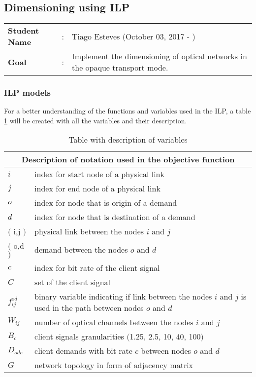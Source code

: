 \newpage
\subsection{Dimensioning using ILP}
\begin{tcolorbox}	
\begin{tabular}{p{2.75cm} p{0.2cm} p{10.5cm}} 	
\textbf{Student Name}  &:& Tiago Esteves    (October 03, 2017 - )\\
\textbf{Goal}          &:& Implement the dimensioning of optical networks in the opaque transport mode.
\end{tabular}
\end{tcolorbox}

\subsubsection{ILP models}\label{ILP_models_OP}

For a better understanding of the functions and variables used in the ILP, a table \ref{description_opaque} will be created with all the variables and their description. \\

\begin{table}[h!]
\centering
\begin{tabular}{ |p{1cm}||p{13cm}|}
 \hline
 \multicolumn{2}{|c|}{Description of notation used in the objective function} \\
 \hline
 \hline
 $i$ & index for start node of a physical link \\
 $j$ & index for end node of a physical link \\
 $o$ & index for node that is origin of a demand \\
 $d$ & index for node that is destination of a demand \\
 $($ i,j $)$ & physical link between the nodes $i$ and $j$ \\
 $($ o,d $)$ & demand between the nodes $o$ and $d$ \\
 $c$ & index for bit rate of the client signal \\
 $C$ & set of the client signal \\
 $f_{ij}^{od}$ & binary variable indicating if link between the nodes $i$ and $j$ is used in the path between nodes $o$ and $d$ \\
 $W_{ij}$ & number of optical channels between the nodes $i$ and $j$\\
 $B_c $ & client signals granularities $($1.25, 2.5, 10, 40, 100$)$ \\
 $D_{odc}$ & client demands with bit rate $c$ between nodes $o$ and $d$ \\
 $G$ & network topology in form of adjacency matrix \\
 \hline
\end{tabular}
\caption{Table with description of variables}
\label{description_opaque}
\end{table}
\vspace{11pt}

